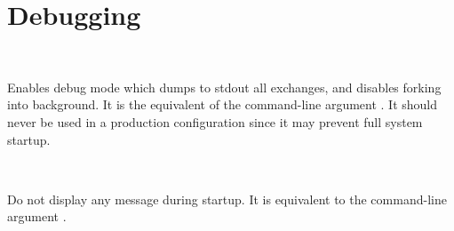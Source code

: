 
\section{Debugging}

\begin{keywords}

 \ 

  Enables debug mode which dumps to stdout all exchanges, and disables forking
  into background. It is the equivalent of the command-line argument .
  It should never be used in a production configuration since it may prevent full
  system startup.

 \ 

  Do not display any message during startup. It is equivalent to the
  command-line argument .


\end{keywords}
